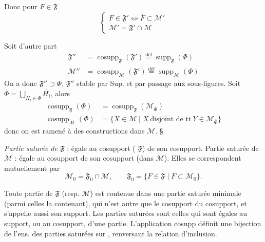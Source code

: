 \documentclass[11pt,a4paper]{article}
\begin{document}
Donc pour $F \in \mathfrak{F}$
\[
  \left\lbrace
  \begin{array}{l}
    F \in \mathfrak{F}' \Longleftrightarrow \overline{F} \subset \mathcal{M}' \\
    \mathcal{M}' = \mathfrak{F}' \cap \mathcal{M}
  \end{array}
  \right.
\]

Soit d'autre part
\begin{align*}
  \mathfrak{F}'' &= \operatorname{cosupp}_{\mathfrak{F}}(\mathfrak{F}') \overset{\text{déf}}{=} \operatorname{supp}_{\mathfrak{F}}(\Phi) \\
  \mathcal{M}'' &= \operatorname{cosupp}_{\mathcal{M}}(\mathfrak{F}') \overset{\text{déf}}{=} \operatorname{supp}_{\mathcal{M}}(\Phi)
\end{align*}
On a donc $\mathfrak{F}'' \supset \Phi$, $\mathfrak{F}''$ stable par Sup. \struck{\ill{} $\Phi$} et par passage aux sous-figures. Soit $\overline{\Phi} = \bigcup_{H_i \in \Phi} \overline{H_i}$, alors
\begin{align*}
  \operatorname{cosupp}_{\mathfrak{F}}(\Phi) &= \operatorname{cosupp}_{\mathfrak{F}}(\mathcal{M}_{\overline{\Phi}}) \\
  \operatorname{cosupp}_{\mathcal{M}}(\Phi) &= \lbrace X \in \mathcal{M} \mid X \ \text{disjoint de tt}\ Y \in \mathcal{M}_{\overline{\Phi}} \rbrace
\end{align*}
donc on est ramené à des constructions dans $\mathcal{M}$. §

\emph{Partie saturée de $\mathfrak{F}$}  : égale au cosupport ( $\mathfrak{F}$) de son cosupport. Partie saturée  de $\mathcal{M}$ : égale au cosupport de son cosupport (dans $\mathcal{M}$). Elles se correspondent mutuellement par
\[
  \mathcal{M}_0 = \mathfrak{F}_0 \cap \mathcal{M} , \qquad \mathfrak{F}_0 = \lbrace F \in \mathfrak{F} \mid F \subset \mathcal{M}_0 \rbrace .
\]


Toute partie de $\mathfrak{F}$ (resp. $\mathcal{M}$) est contenue dans une partie saturée minimale (parmi celles la contenant), qui  n'est autre que le cosupport du cosupport, et s'appelle aussi son support. Les parties saturées sont celles qui sont égales au support, ou au cosupport, d'une partie. L'application cosupp définit une bijection de l'ens. des parties saturées sur \ill{}, renversant la relation d'inclusion.
\end{document}
